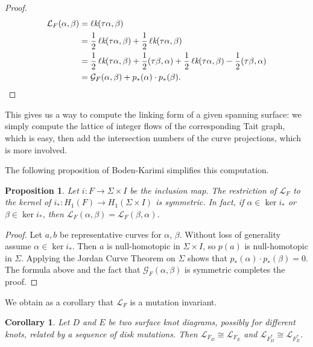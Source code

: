\documentclass[12pt]{report}
\newcommand{\lk}{\operatorname{\ell\textit{k}}}
\newtheorem*{proposition}{Proposition}
\newtheorem*{corollary}{Corollary}
\theoremstyle{upright}
\begin{document}
\begin{proof}
\begin{align*}
\mathcal{L}_{F}(\alpha, \beta) & = \lk(\tau \alpha, \beta) \\
& = \dfrac{1}{2}\lk(\tau \alpha, \beta) + \dfrac{1}{2}\lk(\tau \alpha, \beta)\\
& = \dfrac{1}{2}\lk(\tau \alpha, \beta) + \dfrac{1}{2}(\tau \beta, \alpha) + \dfrac{1}{2}\lk(\tau \alpha, \beta) - \dfrac{1}{2}(\tau \beta, \alpha)\\
& = \mathcal{G}_{F}(\alpha, \beta) + p_{*}(\alpha) \cdot p_{*}(\beta). \qedhere
\end{align*}
\end{proof}

This gives us a way to compute the linking form of a given spanning surface: we simply compute the lattice of integer flows of the corresponding Tait graph, which is easy, then add the intersection numbers of the curve projections, which is more involved.

The following proposition of Boden-Karimi \cite[Remark 3.2]{mock-seifert-matrices} simplifies this computation.

\begin{proposition}
	Let $i: F \longrightarrow \Sigma \times I$ be the inclusion map. The restriction of $\mathcal{L}_{F}$ to the kernel of ${i_{*}: H_{1}(F) \longrightarrow H_{1}(\Sigma \times I)}$ is symmetric. In fact, if $\alpha \in \ker i_{*}$ or $\beta \in \ker i_{*}$, then ${\mathcal{L}_{F}(\alpha, \beta) = \mathcal{L}_{F}(\beta, \alpha)}$.
\end{proposition}

\begin{proof}
	Let $a, b$ be representative curves for $\alpha$, $\beta$. Without loss of generality assume $\alpha \in \ker i_{*}$. Then $a$ is null-homotopic in $\Sigma \times I$, so $p(a)$ is null-homotopic in $\Sigma$. Applying the Jordan Curve Theorem on $\Sigma$  shows that $p_{*}(\alpha) \cdot p_{*}(\beta) = 0$. The formula above and the fact that $\mathcal{G}_{F}(\alpha, \beta)$ is symmetric completes the proof.
\end{proof}

We obtain as a corollary that $\mathcal{L}_{F}$ is a mutation invariant.

\begin{corollary}
	Let  $D$ and $E$ be two surface knot diagrams, possibly for different knots, related by a sequence of disk mutations. Then $\mathcal{L}_{F_{D}} \cong \mathcal{L}_{F_{E}}$ and $\mathcal{L}_{F_{D}^{*}} \cong \mathcal{L}_{F_{E}^{*}}$.
\end{corollary}
\end{document}
